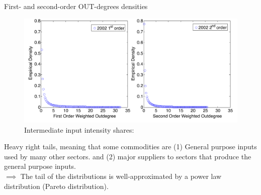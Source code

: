 \documentclass[dvipsnames]{beamer}
\begin{document}
\begin{frame}{First- and second-order OUT-degrees densities}
    \justifying
    \begin{figure}[H]
        \caption*{ Intermediate input intensity shares:}
        \includegraphics[scale=0.6]{5}
        \centering
    \end{figure}  

Heavy right tails, meaning that some commodities are (1) General purpose inputs used by many other sectors.
and (2) major suppliers to sectors that produce the general purpose inputs.\\[5pt]

$\implies$ The tail of the distributions is well-approximated by a power law
distribution (Pareto distribution).

\end{frame}
\end{document}
